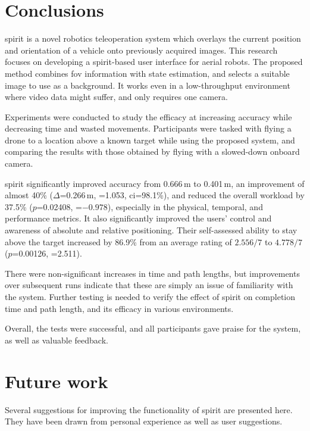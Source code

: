 
\chapter{Conclusions}
\label{ch:conclusion}
\gls{spirit} is a novel robotics teleoperation system which overlays the current position and orientation of a vehicle onto previously acquired images.
This research focuses on developing a \gls{spirit}-based user interface for aerial robots.
The proposed method combines \gls{fov} information with state estimation, and selects a suitable image to use as a background.
It works even in a low-throughput environment where video data might suffer, and only requires one camera.

Experiments were conducted to study the efficacy at increasing accuracy while decreasing time and wasted movements.
Participants were tasked with flying a drone to a location above a known target while using the proposed system, and comparing the results with those obtained by flying with a slowed-down onboard camera.

\gls{spirit} significantly improved accuracy from 0.666\,m to 0.401\,m, an improvement of almost 40\% ($\Delta$=0.266\,m, =1.053, \acrshort{ci}=98.1\%), and reduced the overall workload by 37.5\% ($p$=0.02408, =$-0.978$), especially in the physical, temporal, and performance metrics.
It also significantly improved the users' control and awareness of absolute and relative positioning.
Their self-assessed ability to stay above the target increased by 86.9\% from an average rating of $2.556/7$ to $4.778/7$ ($p$=0.00126, =2.511).

There were non-significant increases in time and path lengths, but improvements over subsequent runs indicate that these are simply an issue of familiarity with the system.
Further testing is needed to verify the effect of \gls{spirit} on completion time and path length, and its efficacy in various environments.

Overall, the tests were successful, and all participants gave praise for the system, as well as valuable feedback.


\chapter{Future work}
Several suggestions for improving the functionality of \gls{spirit} are presented here.
They have been drawn from personal experience as well as user suggestions.

